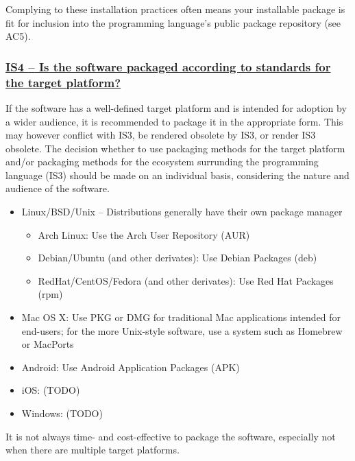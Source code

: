\documentclass[a4paper,11pt]{article}
\newcommand{\criterion}[1]{\subsubsection*{\underline{#1}}}
\begin{document}
Complying to these installation practices often means your installable package
is fit for inclusion into the programming language's public package repository
(see AC5).

\newcommand{\isFourID}{IS4}
\newcommand{\isFourText}{Is the software packaged according to standards for the target platform?}
\criterion{\isFourID{ }--{ }\isFourText}\label{id:is4} 

If the software has a well-defined target platform and is intended for adoption
by a wider audience, it is recommended to package it in the appropriate form.
This may however conflict with IS3, be rendered obsolete by IS3, or render IS3
obsolete. The decision whether to use packaging methods for the target platform
and/or packaging methods for the ecosystem surrunding the programming language
(IS3) should be
%
%
%
made on an individual basis, considering the nature and audience of the
software.

\begin{itemize}
    \item Linux/BSD/Unix -- Distributions generally have their own package manager
    \begin{itemize}
        \item Arch Linux: Use the Arch User Repository (AUR)
        \item Debian/Ubuntu (and other derivates): Use Debian Packages (deb)
        \item RedHat/CentOS/Fedora (and other derivates): Use Red Hat Packages (rpm)
    \end{itemize}
    \item Mac OS X: Use PKG or DMG for traditional Mac applications intended for end-users; for the more Unix-style
        software, use a system such as Homebrew or MacPorts
    \item Android: Use Android Application Packages (APK)
    \item iOS: (TODO) 
    \item Windows: (TODO) 
\end{itemize}

It is not always time- and cost-effective to package the software, especially not
when there are multiple target platforms. 
\end{document}
